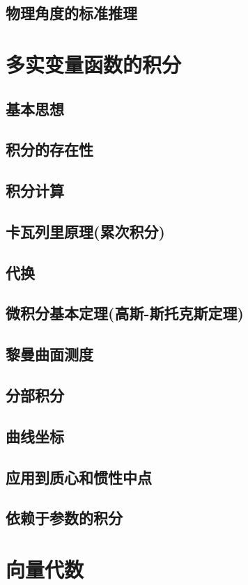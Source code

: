 \section{物理角度的标准推理}

\chapter{多实变量函数的积分}
\section{基本思想}
\section{积分的存在性}
\section{积分计算}
\section{卡瓦列里原理(累次积分)}
\section{代换}
\section{微积分基本定理(高斯-斯托克斯定理)}
\section{黎曼曲面测度}
\section{分部积分}
\section{曲线坐标}
\section{应用到质心和惯性中点}
\section{依赖于参数的积分}

\chapter{向量代数}
